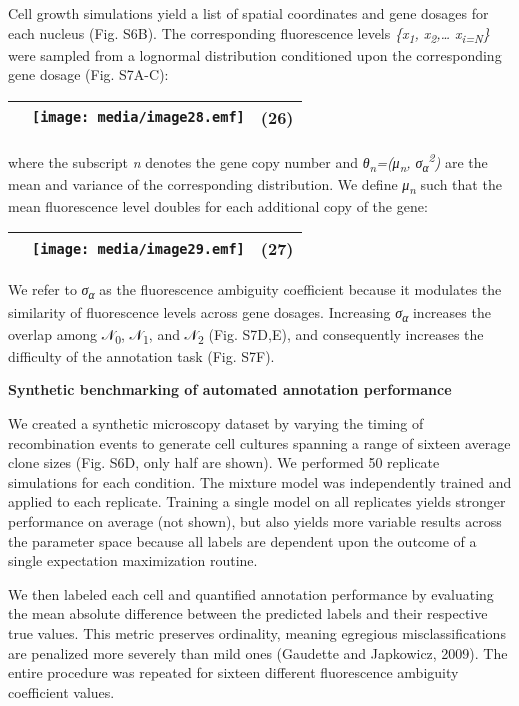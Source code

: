 Cell growth simulations yield a list of spatial coordinates and gene dosages for each nucleus (Fig. S6B). The corresponding fluorescence levels \emph{\{x\textsubscript{1}, x\textsubscript{2},\ldots{} x\textsubscript{i=N}\}} were sampled from a lognormal distribution conditioned upon the corresponding gene dosage (Fig. S7A-C):

\begin{longtable}[]{@{}lll@{}}
\toprule
& \texttt{[image: media/image28.emf]} & (26)\tabularnewline
\bottomrule
\end{longtable}

where the subscript \emph{n} denotes the gene copy number and \emph{θ\textsubscript{n}=(μ\textsubscript{n}, σ\textsubscript{α}\textsuperscript{2})} are the mean and variance of the corresponding distribution. We define \emph{μ\textsubscript{n}} such that the mean fluorescence level doubles for each additional copy of the gene:

\begin{longtable}[]{@{}lll@{}}
\toprule
& \texttt{[image: media/image29.emf]} & (27)\tabularnewline
\bottomrule
\end{longtable}

We refer to \emph{σ\textsubscript{α}} as the fluorescence ambiguity coefficient because it modulates the similarity of fluorescence levels across gene dosages. Increasing \emph{σ\textsubscript{α}} increases the overlap among 𝒩\textsubscript{0}, 𝒩\textsubscript{1}, and 𝒩\textsubscript{2} (Fig. S7D,E), and consequently increases the difficulty of the annotation task (Fig. S7F).

\textbf{Synthetic benchmarking of automated annotation performance}

We created a synthetic microscopy dataset by varying the timing of recombination events to generate cell cultures spanning a range of sixteen average clone sizes (Fig. S6D, only half are shown). We performed 50 replicate simulations for each condition. The mixture model was independently trained and applied to each replicate. Training a single model on all replicates yields stronger performance on average (not shown), but also yields more variable results across the parameter space because all labels are dependent upon the outcome of a single expectation maximization routine.

We then labeled each cell and quantified annotation performance by evaluating the mean absolute difference between the predicted labels and their respective true values. This metric preserves ordinality, meaning egregious misclassifications are penalized more severely than mild ones (Gaudette and Japkowicz, 2009). The entire procedure was repeated for sixteen different fluorescence ambiguity coefficient values.

